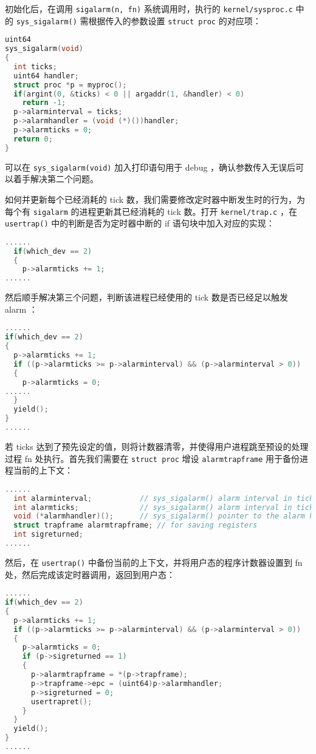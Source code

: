 初始化后，在调用 \lstinline{sigalarm(n, fn)} 系统调用时，执行的 \lstinline{kernel/sysproc.c} 中的 \lstinline{sys_sigalarm()} 需根据传入的参数设置 \lstinline{struct proc} 的对应项：
\begin{lstlisting}[language=C]
uint64
sys_sigalarm(void)
{
  int ticks;
  uint64 handler;
  struct proc *p = myproc();
  if(argint(0, &ticks) < 0 || argaddr(1, &handler) < 0)
    return -1;
  p->alarminterval = ticks;
  p->alarmhandler = (void (*)())handler;
  p->alarmticks = 0;
  return 0;
}
\end{lstlisting}

可以在 \lstinline{sys_sigalarm(void)} 加入打印语句用于 debug ，确认参数传入无误后可以着手解决第二个问题。

如何并更新每个已经消耗的 tick 数，我们需要修改定时器中断发生时的行为，为每个有 \lstinline{sigalarm} 的进程更新其已经消耗的 tick 数。打开 \lstinline{kernel/trap.c} ，在 \lstinline{usertrap()} 中的判断是否为定时器中断的 if 语句块中加入对应的实现：

\begin{lstlisting}[language=C]
......
  if(which_dev == 2)
  {
    p->alarmticks += 1;
......
\end{lstlisting}

然后顺手解决第三个问题，判断该进程已经使用的 tick 数是否已经足以触发 alarm ：
\begin{lstlisting}[language=C]
......
if(which_dev == 2)
{
  p->alarmticks += 1;
  if ((p->alarmticks >= p->alarminterval) && (p->alarminterval > 0))
  {
    p->alarmticks = 0;
......
  }
  yield();
}
......
\end{lstlisting}

若 ticks 达到了预先设定的值，则将计数器清零，并使得用户进程跳至预设的处理过程 fn 处执行。首先我们需要在 \lstinline{struct proc} 增设 \lstinline{alarmtrapframe} 用于备份进程当前的上下文：
\begin{lstlisting}[language=C]
......
  int alarminterval;           // sys_sigalarm() alarm interval in ticks
  int alarmticks;              // sys_sigalarm() alarm interval in ticks
  void (*alarmhandler)();      // sys_sigalarm() pointer to the alarm handler
  struct trapframe alarmtrapframe; // for saving registers
  int sigreturned;
......
\end{lstlisting}

然后，在 \lstinline{usertrap()} 中备份当前的上下文，并将用户态的程序计数器设置到 fn 处，然后完成该定时器调用，返回到用户态：
\begin{lstlisting}[language=C]
......
if(which_dev == 2)
{
  p->alarmticks += 1;
  if ((p->alarmticks >= p->alarminterval) && (p->alarminterval > 0))
  {
    p->alarmticks = 0;
    if (p->sigreturned == 1)
    {
      p->alarmtrapframe = *(p->trapframe);
      p->trapframe->epc = (uint64)p->alarmhandler;
      p->sigreturned = 0;
      usertrapret();
    }
  }
  yield();
}
......
\end{lstlisting}

